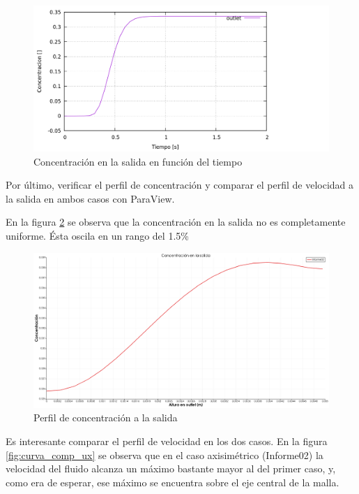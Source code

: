 \documentclass{article}
\begin{document}
\begin{figure}[h!]
	\centering
	\includegraphics[width=1\textwidth]{Figuras/07_patchAverage.png}
	\caption{Concentración en la salida en función del tiempo}
	\label{fig:curva_conc}
\end{figure}

Por último, verificar el perfil de concentración y comparar el perfil de velocidad a la salida en ambos casos con ParaView.

En la figura \ref{fig:curva_conc} se observa que la concentración en la salida no es completamente uniforme. Ésta oscila en un rango del 1.5\%

\begin{figure}[h!]
	\centering
	\includegraphics[width=1\textwidth]{Figuras/07_perfilT.png}
	\caption{Perfil de concentración a la salida}
	\label{fig:curva_conc}
\end{figure}

\bigskip\bigskip\bigskip\bigskip\bigskip\bigskip\bigskip\bigskip\bigskip\bigskip\bigskip\bigskip\bigskip\bigskip\bigskip\bigskip
Es interesante comparar el perfil de velocidad en los dos casos. En la figura \ref{fig:curva_comp_ux} se observa que en el caso axisimétrico (Informe02) la velocidad del fluido alcanza un máximo bastante mayor al del primer caso, y, como era de esperar, ese máximo se encuentra sobre el eje central de la malla.
\end{document}
